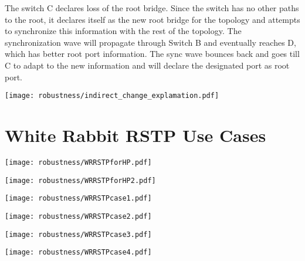 The switch C declares loss of the root bridge. Since the switch has no other 
paths to the root, it declares
itself as the new root bridge for the topology and attempts to synchronize  this
information with the rest of 
the topology. The synchronization wave will propagate through Switch B and 
eventually reaches D, which has better root port information. The sync wave
bounces back and goes till C to adapt to the new information and will declare
the designated port as root port.

\begin{center}
        \texttt{[image: robustness/indirect\_change\_explamation.pdf]}
        \label{fig:indirect_change}
\end{center}

\section{White Rabbit RSTP Use Cases}

\begin{center}
	\texttt{[image: robustness/WRRSTPforHP.pdf]}
	\label{fig:WRRSTPforHP}
\end{center}

\begin{center}
	\texttt{[image: robustness/WRRSTPforHP2.pdf]}
	\label{fig:WRRSTPforHP2}
\end{center}

\begin{center}
	\texttt{[image: robustness/WRRSTPcase1.pdf]}
	\label{fig:WRRSTPcase1}
\end{center}

\begin{center}
	\texttt{[image: robustness/WRRSTPcase2.pdf]}
	\label{fig:WRRSTPcase2}
\end{center}
\begin{center}
	\texttt{[image: robustness/WRRSTPcase3.pdf]}
	\label{fig:WRRSTPcase3}
\end{center}

\begin{center}
	\texttt{[image: robustness/WRRSTPcase4.pdf]}
	\label{fig:WRRSTPcase4}
\end{center}

